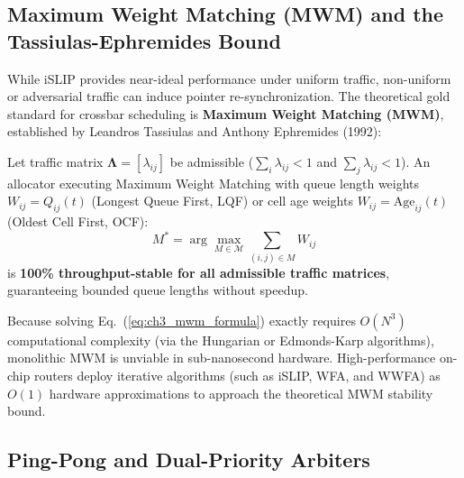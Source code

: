 \subsection{Maximum Weight Matching (MWM) and the Tassiulas-Ephremides Bound}
\label{subsec:ch3_mwm}

While iSLIP provides near-ideal performance under uniform traffic, non-uniform or adversarial traffic can induce pointer re-synchronization. The theoretical gold standard for crossbar scheduling is \textbf{Maximum Weight Matching (MWM)}, established by Leandros Tassiulas and Anthony Ephremides (1992):

\begin{theorem}
Let traffic matrix $\boldsymbol{\Lambda} = [\lambda_{ij}]$ be admissible ($\sum_i \lambda_{ij} < 1$ and $\sum_j \lambda_{ij} < 1$). An allocator executing Maximum Weight Matching with queue length weights $W_{ij} = Q_{ij}(t)$ (Longest Queue First, LQF) or cell age weights $W_{ij} = \text{Age}_{ij}(t)$ (Oldest Cell First, OCF):
\begin{equation}
M^* = \arg\max_{M \in \mathcal{M}} \sum_{(i,j) \in M} W_{ij}
\label{eq:ch3_mwm_formula}
\end{equation}
is \textbf{100\% throughput-stable for all admissible traffic matrices}, guaranteeing bounded queue lengths without speedup.
\end{theorem}

Because solving Eq.~(\ref{eq:ch3_mwm_formula}) exactly requires $O(N^3)$ computational complexity (via the Hungarian or Edmonds-Karp algorithms), monolithic MWM is unviable in sub-nanosecond hardware. High-performance on-chip routers deploy iterative algorithms (such as iSLIP, WFA, and WWFA) as $O(1)$ hardware approximations to approach the theoretical MWM stability bound.

\subsection{Ping-Pong and Dual-Priority Arbiters}
\label{subsec:ch3_pingpong}

